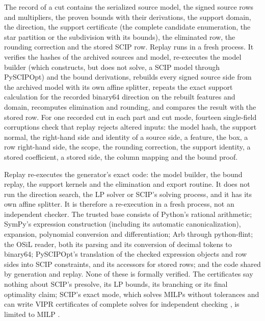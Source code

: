 The record of a cut contains the serialized source model, the signed source
rows and multipliers, the proven bounds with their derivations, the support
domain, the direction, the support certificate (the complete candidate
enumeration, the star partition or the subdivision with its bounds), the
eliminated row, the rounding correction and the stored SCIP row. Replay runs
in a fresh process. It verifies the hashes of the archived sources and model,
re-executes the model builder (which constructs, but does not solve, a SCIP
model through PySCIPOpt) and the bound derivations, rebuilds every signed
source side from the archived model with its own affine splitter, repeats the
exact support calculation for the recorded binary64 direction on the rebuilt
features and domain, recomputes elimination and rounding, and compares the
result with the stored row. For one recorded cut in each part and cut mode,
fourteen single-field corruptions check that replay rejects altered inputs:
the model hash, the support normal, the right-hand side and identity of a
source side, a feature, the box, a row right-hand side, the scope, the
rounding correction, the support identity, a stored coefficient, a stored
side, the column mapping and the bound proof.

Replay re-executes the generator's exact code: the model builder, the bound
replay, the support kernels and the elimination and export routine. It does
not run the direction search, the LP solver or SCIP's solving process, and it
has its own affine splitter. It is therefore a re-execution in a fresh
process, not an independent checker. The trusted base consists of Python's
rational arithmetic; SymPy's expression construction (including its automatic
canonicalization), expansion, polynomial conversion and differentiation; Arb
through python-flint; the OSiL reader, both its parsing and its conversion of
decimal tokens to binary64; PySCIPOpt's translation of the checked expression
objects and row sides into SCIP constraints, and its accessors for stored
rows; and the code shared by generation and replay. None of these is formally
verified. The certificates say nothing about SCIP's presolve, its LP bounds,
its branching or its final optimality claim; SCIP's exact mode, which solves
MILPs without tolerances and can write VIPR certificates of complete solves
for independent checking \citep{CheungGleixnerSteffy2017,EiflerGleixner2023},
is limited to MILP \citep{SCIP10}.
